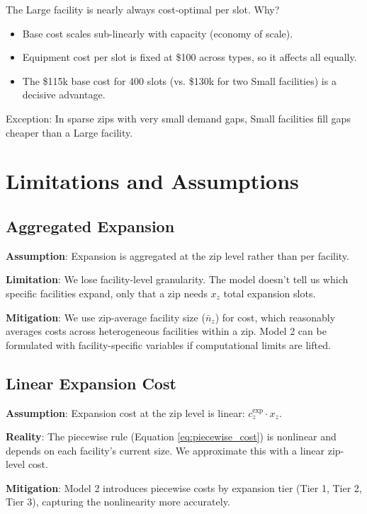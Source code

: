 \documentclass[12pt]{article}
\begin{document}
\noindent
The Large facility is nearly always cost-optimal per slot. Why?

\begin{itemize}
    \item Base cost scales sub-linearly with capacity (economy of scale).
    \item Equipment cost per slot is fixed at \$100 across types, so it affects all equally.
    \item The \$115k base cost for 400 slots (vs. \$130k for two Small facilities) is a decisive advantage.
\end{itemize}

\noindent
Exception: In sparse zips with very small demand gaps, Small facilities fill gaps cheaper than a Large facility.

\section{Limitations and Assumptions}

\subsection{Aggregated Expansion}

\textbf{Assumption}: Expansion is aggregated at the zip level rather than per facility.

\textbf{Limitation}: We lose facility-level granularity. The model doesn't tell us which specific facilities expand, 
only that a zip needs $x_z$ total expansion slots.

\textbf{Mitigation}: We use zip-average facility size ($\bar{n}_z$) for cost, which reasonably averages 
costs across heterogeneous facilities within a zip. Model 2 can be formulated with facility-specific variables 
if computational limits are lifted.

\subsection{Linear Expansion Cost}

\textbf{Assumption}: Expansion cost at the zip level is linear: $c_z^{\text{exp}} \cdot x_z$.

\textbf{Reality}: The piecewise rule (Equation \eqref{eq:piecewise_cost}) is nonlinear and depends on each 
facility's current size. We approximate this with a linear zip-level cost.

\textbf{Mitigation}: Model 2 introduces piecewise costs by expansion tier (Tier 1, Tier 2, Tier 3), capturing 
the nonlinearity more accurately.
\end{document}

